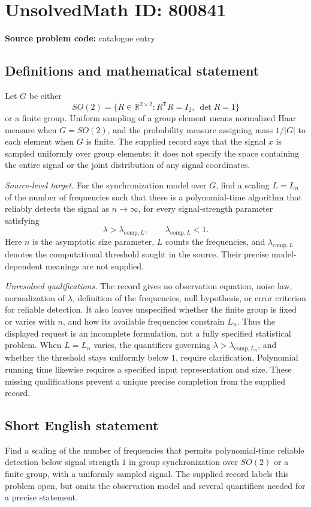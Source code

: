 \documentclass[11pt]{article}
\newcommand{\R}{\mathbb{R}}
\begin{document}
\section*{UnsolvedMath ID: 800841}
\textbf{Source problem code:} catalogue entry
\subsection{Definitions and mathematical statement}
Let \(G\) be either
\[
SO(2)=\{R\in\R^{2\times2}:R^{\mathsf T}R=I_2,\ \det R=1\}
\]
or a finite group. Uniform sampling of a group element means normalized Haar measure when \(G=SO(2)\), and the probability measure assigning mass \(1/|G|\) to each element when \(G\) is finite. The supplied record says that the signal \(x\) is sampled uniformly over group elements; it does not specify the space containing the entire signal or the joint distribution of any signal coordinates.

\emph{Source-level target.} For the synchronization model over \(G\), find a scaling \(L=L_n\) of the number of frequencies such that there is a polynomial-time algorithm that reliably detects the signal as \(n\to\infty\), for every signal-strength parameter satisfying
\[
\lambda>\lambda_{\mathrm{comp},L},
\qquad \lambda_{\mathrm{comp},L}<1.
\]
Here \(n\) is the asymptotic size parameter, \(L\) counts the frequencies, and \(\lambda_{\mathrm{comp},L}\) denotes the computational threshold sought in the source. Their precise model-dependent meanings are not supplied.

\emph{Unresolved qualifications.} The record gives no observation equation, noise law, normalization of \(\lambda\), definition of the frequencies, null hypothesis, or error criterion for reliable detection. It also leaves unspecified whether the finite group is fixed or varies with \(n\), and how its available frequencies constrain \(L_n\). Thus the displayed request is an incomplete formulation, not a fully specified statistical problem. When \(L=L_n\) varies, the quantifiers governing \(\lambda>\lambda_{\mathrm{comp},L_n}\), and whether the threshold stays uniformly below \(1\), require clarification. Polynomial running time likewise requires a specified input representation and size. These missing qualifications prevent a unique precise completion from the supplied record.
\subsection{Short English statement}
Find a scaling of the number of frequencies that permits polynomial-time reliable detection below signal strength \(1\) in group synchronization over \(SO(2)\) or a finite group, with a uniformly sampled signal. The supplied record labels this problem open, but omits the observation model and several quantifiers needed for a precise statement.
\end{document}
